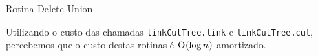 \begin{algorithm}[h!]
    \caption{Rotina Delete Union}\label{uf:delete-union}
    \begin{algorithmic}[1]
        \EndFunction
    \end{algorithmic}
\end{algorithm}

Utilizando o custo das chamadas \texttt{linkCutTree.link} e \texttt{linkCutTree.cut}, percebemos que o custo destas rotinas é $\mathrm{O}(\log n)$ amortizado.